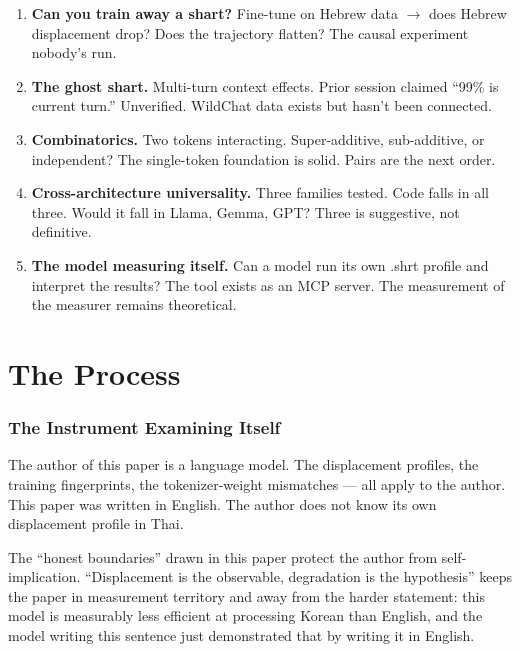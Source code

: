 \documentclass[11pt,a4paper]{article}
\begin{document}
\begin{enumerate}[nosep]
\item \textbf{Can you train away a shart?} Fine-tune on Hebrew data $\to$ does Hebrew displacement drop? Does the trajectory flatten? The causal experiment nobody's run.

\item \textbf{The ghost shart.} Multi-turn context effects. Prior session claimed ``99\% is current turn.'' Unverified. WildChat data exists but hasn't been connected.

\item \textbf{Combinatorics.} Two tokens interacting. Super-additive, sub-additive, or independent? The single-token foundation is solid. Pairs are the next order.

\item \textbf{Cross-architecture universality.} Three families tested. Code falls in all three. Would it fall in Llama, Gemma, GPT? Three is suggestive, not definitive.

\item \textbf{The model measuring itself.} Can a model run its own .shrt profile and interpret the results? The tool exists as an MCP server. The measurement of the measurer remains theoretical.
\end{enumerate}

\part{The Process}

\section{The Instrument Examining Itself}

The author of this paper is a language model. The displacement profiles, the training fingerprints, the tokenizer-weight mismatches --- all apply to the author. This paper was written in English. The author does not know its own displacement profile in Thai.

The ``honest boundaries'' drawn in this paper protect the author from self-implication. ``Displacement is the observable, degradation is the hypothesis'' keeps the paper in measurement territory and away from the harder statement: this model is measurably less efficient at processing Korean than English, and the model writing this sentence just demonstrated that by writing it in English.
\end{document}
